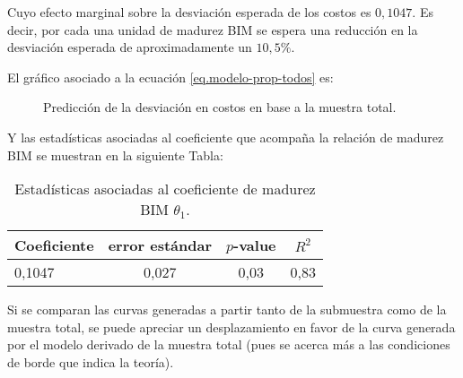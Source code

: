 Cuyo efecto marginal sobre la desviación esperada de los costos es $0,1047$. Es decir, por cada una unidad de madurez BIM se espera una reducción en la desviación esperada de aproximadamente un $10,5\%$.

El gráfico asociado a la ecuación \eqref{eq.modelo-prop-todos} es:

\begin{figure}[H]
    \centering
    \caption{Predicción de la desviación en costos en base a la muestra total.}
\end{figure}

Y las estadísticas asociadas al coeficiente que acompaña la relación de madurez BIM se muestran en la siguiente Tabla:

\begin{table}[H]
    \centering
    \label{tab.est}
    \caption{Estadísticas asociadas al coeficiente de madurez BIM $\theta_1$.}
    \begin{tabular}{lccc}
        \toprule
        Coeficiente & error estándar & $p$-value & $R^2$\\
        \midrule
        0,1047 & 0,027 & 0,03 & 0,83\\  
        \bottomrule        
    \end{tabular}
\end{table}

Si se comparan las curvas generadas a partir tanto de la submuestra como de la muestra total, se puede apreciar un desplazamiento en favor de la curva generada por el modelo derivado de la muestra total (pues se acerca más a las condiciones de borde que indica la teoría).

